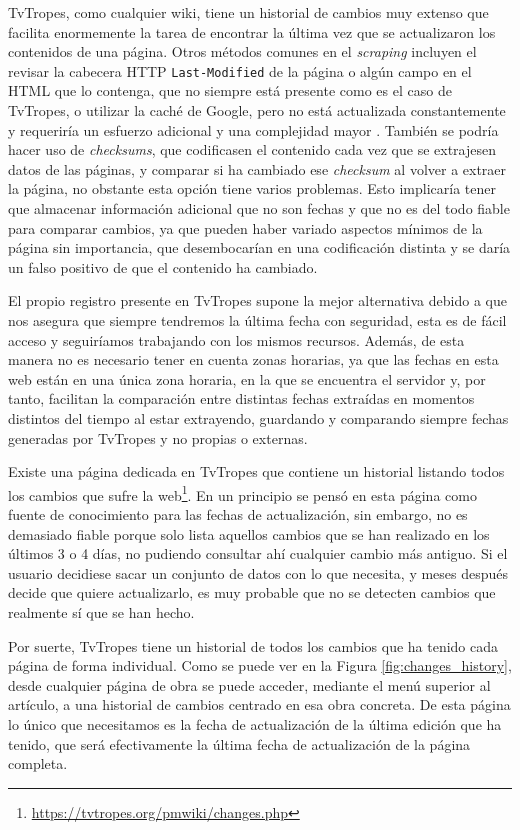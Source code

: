 TvTropes, como cualquier wiki, tiene un historial de cambios muy extenso que
facilita enormemente la tarea de encontrar la última vez que se actualizaron los
contenidos de una página. Otros métodos comunes en el \textit{scraping} incluyen
el revisar la cabecera HTTP \texttt{Last-Modified} de la página o algún campo en
el HTML que lo contenga, que no siempre está presente como es el caso de
TvTropes, o utilizar la caché de Google, pero no está actualizada constantemente
y requeriría un esfuerzo adicional y una complejidad mayor
\cite{find_last_updated}. También se podría hacer uso de \textit{checksums}, que
codificasen el contenido cada vez que se extrajesen datos de las páginas, y
comparar si ha cambiado ese \textit{checksum} al volver a extraer la página, no
obstante esta opción tiene varios problemas. Esto implicaría tener que almacenar
información adicional que no son fechas y que no es del todo fiable para
comparar cambios, ya que pueden haber variado aspectos mínimos de la página sin
importancia, que desembocarían en una codificación distinta y se daría un
falso positivo de que el contenido ha cambiado. 

El propio registro presente en TvTropes supone la mejor alternativa debido a que
nos asegura que siempre tendremos la última fecha con seguridad, esta es de
fácil acceso y seguiríamos trabajando con los mismos recursos. Además, de esta
manera no es necesario tener en cuenta zonas horarias, ya que las fechas en esta
web están en una única zona horaria, en la que se encuentra el servidor y, por
tanto, facilitan la comparación entre distintas fechas extraídas en momentos
distintos del tiempo al estar extrayendo, guardando y comparando siempre fechas
generadas por TvTropes y no propias o externas.

Existe una página dedicada en TvTropes que contiene un historial listando todos
los cambios que sufre la
web\footnote{\url{https://tvtropes.org/pmwiki/changes.php}}. En un principio se
pensó en esta página como fuente de conocimiento para las fechas de
actualización, sin embargo, no es demasiado fiable porque solo lista aquellos
cambios que se han realizado en los últimos 3 o 4 días, no pudiendo consultar
ahí cualquier cambio más antiguo. Si el usuario decidiese sacar un conjunto de
datos con lo que necesita, y meses después decide que quiere actualizarlo, es
muy probable que no se detecten cambios que realmente sí que se han hecho.

Por suerte, TvTropes tiene un historial de todos los cambios que ha tenido cada
página de forma individual. Como se puede ver en la Figura
\ref{fig:changes_history}, desde cualquier página de obra se puede acceder,
mediante el menú superior al artículo, a una historial de cambios centrado en
esa obra concreta. De esta página lo único que necesitamos es la fecha de
actualización de la última edición que ha tenido, que será efectivamente la
última fecha de actualización de la página completa.


